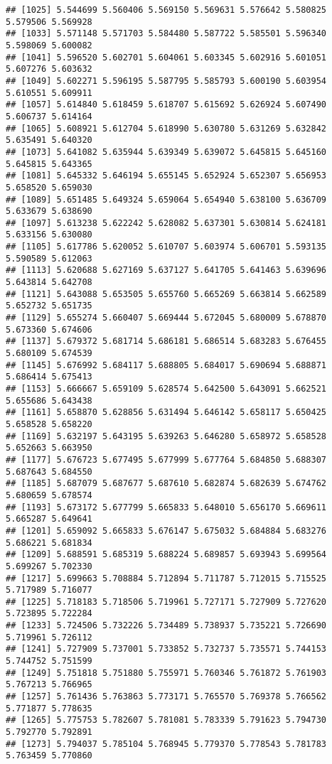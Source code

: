 \documentclass[
]{article}
\begin{document}
\begin{verbatim}
## [1025] 5.544699 5.560406 5.569150 5.569631 5.576642 5.580825 5.579506 5.569928
## [1033] 5.571148 5.571703 5.584480 5.587722 5.585501 5.596340 5.598069 5.600082
## [1041] 5.596520 5.602701 5.604061 5.603345 5.602916 5.601051 5.607276 5.603632
## [1049] 5.602271 5.596195 5.587795 5.585793 5.600190 5.603954 5.610551 5.609911
## [1057] 5.614840 5.618459 5.618707 5.615692 5.626924 5.607490 5.606737 5.614164
## [1065] 5.608921 5.612704 5.618990 5.630780 5.631269 5.632842 5.635491 5.640320
## [1073] 5.641082 5.635944 5.639349 5.639072 5.645815 5.645160 5.645815 5.643365
## [1081] 5.645332 5.646194 5.655145 5.652924 5.652307 5.656953 5.658520 5.659030
## [1089] 5.651485 5.649324 5.659064 5.654940 5.638100 5.636709 5.633679 5.638690
## [1097] 5.613238 5.622242 5.628082 5.637301 5.630814 5.624181 5.633156 5.630080
## [1105] 5.617786 5.620052 5.610707 5.603974 5.606701 5.593135 5.590589 5.612063
## [1113] 5.620688 5.627169 5.637127 5.641705 5.641463 5.639696 5.643814 5.642708
## [1121] 5.643088 5.653505 5.655760 5.665269 5.663814 5.662589 5.652732 5.651735
## [1129] 5.655274 5.660407 5.669444 5.672045 5.680009 5.678870 5.673360 5.674606
## [1137] 5.679372 5.681714 5.686181 5.686514 5.683283 5.676455 5.680109 5.674539
## [1145] 5.676992 5.684117 5.688805 5.684017 5.690694 5.688871 5.686414 5.675413
## [1153] 5.666667 5.659109 5.628574 5.642500 5.643091 5.662521 5.655686 5.643438
## [1161] 5.658870 5.628856 5.631494 5.646142 5.658117 5.650425 5.658528 5.658220
## [1169] 5.632197 5.643195 5.639263 5.646280 5.658972 5.658528 5.652663 5.663950
## [1177] 5.676723 5.677495 5.677999 5.677764 5.684850 5.688307 5.687643 5.684550
## [1185] 5.687079 5.687677 5.687610 5.682874 5.682639 5.674762 5.680659 5.678574
## [1193] 5.673172 5.677799 5.665833 5.648010 5.656170 5.669611 5.665287 5.649641
## [1201] 5.659092 5.665833 5.676147 5.675032 5.684884 5.683276 5.686221 5.681834
## [1209] 5.688591 5.685319 5.688224 5.689857 5.693943 5.699564 5.699267 5.702330
## [1217] 5.699663 5.708884 5.712894 5.711787 5.712015 5.715525 5.717989 5.716077
## [1225] 5.718183 5.718506 5.719961 5.727171 5.727909 5.727620 5.723895 5.722284
## [1233] 5.724506 5.732226 5.734489 5.738937 5.735221 5.726690 5.719961 5.726112
## [1241] 5.727909 5.737001 5.733852 5.732737 5.735571 5.744153 5.744752 5.751599
## [1249] 5.751818 5.751880 5.755971 5.760346 5.761872 5.761903 5.767213 5.766965
## [1257] 5.761436 5.763863 5.773171 5.765570 5.769378 5.766562 5.771877 5.778635
## [1265] 5.775753 5.782607 5.781081 5.783339 5.791623 5.794730 5.792770 5.792891
## [1273] 5.794037 5.785104 5.768945 5.779370 5.778543 5.781783 5.763459 5.770860

\end{verbatim}
\end{document}
